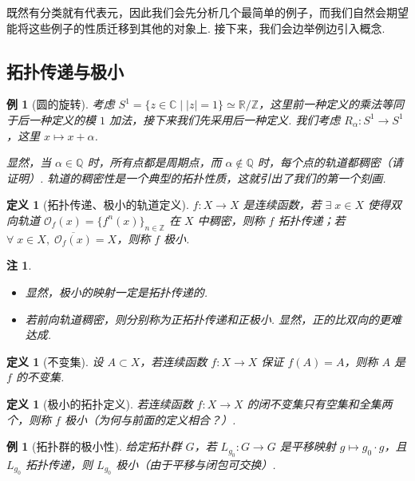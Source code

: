 \documentclass[11pt, a4paper, oneside]{ctexart}
\newtheorem{definition}[theorem]{定义}
\newtheorem{example}[theorem]{例}
\newtheorem{remark}[theorem]{注}
\newcommand{\C}{\mathbb{C}}
\newcommand{\Q}{\mathbb{Q}}
\newcommand{\R}{\mathbb{R}}
\newcommand{\Z}{\mathbb{Z}}
\newcommand{\cO}{\mathcal{O}}
\newcommand{\abs}[1]{\left|{#1}\right|}
\begin{document}
    既然有分类就有代表元，因此我们会先分析几个最简单的例子，而我们自然会期望能将这些例子的性质迁移到其他的对象上. 接下来，我们会边举例边引入概念.

    \subsection{拓扑传递与极小}
    \begin{example}[圆的旋转]
        考虑 $S^1=\{z\in \C\mid \abs{z}=1\}\simeq \R/\Z$，这里前一种定义的乘法等同于后一种定义的模 $1$ 加法，接下来我们先采用后一种定义. 我们考虑 $R_{\alpha}:S^1\to S^1$，这里 $x\mapsto x+\alpha$.

        显然，当 $\alpha\in\Q$ 时，所有点都是周期点，而 $\alpha\notin \Q$ 时，每个点的轨道都稠密（请证明）. 轨道的稠密性是一个典型的拓扑性质，这就引出了我们的第一个刻画.
    \end{example}

    \begin{definition}[拓扑传递、极小的轨道定义]
        $f:X\to X$ 是连续函数，若 $\exists\; x\in X$ 使得双向轨道 $\cO_f(x)={\{f^n(x)\}}_{n\in\Z}$ 在 $X$ 中稠密，则称 $f$ 拓扑传递；若 $\forall\; x\in X,\; \overline{\cO_f(x)}=X$，则称 $f$ 极小.
    \end{definition}
    \begin{remark}
        \begin{itemize}
            \item 显然，极小的映射一定是拓扑传递的.
            \item 若前向轨道稠密，则分别称为正拓扑传递和正极小. 显然，正的比双向的更难达成.
        \end{itemize}
    \end{remark}
    \begin{definition}[不变集]
        设 $A\subset X$，若连续函数 $f:X\to X$ 保证 $f(A)=A$，则称 $A$ 是 $f$ 的不变集.
    \end{definition}
    \begin{definition}[极小的拓扑定义]
        若连续函数 $f:X\to X$ 的闭不变集只有空集和全集两个，则称 $f$ 极小（为何与前面的定义相合？）.
    \end{definition}

    \begin{example}[拓扑群的极小性]\label{例3.6}
        给定拓扑群 $G$，若 $L_{g_0}:G\to G$ 是平移映射 $g\mapsto g_0\cdot g$，且 $L_{g_0}$ 拓扑传递，则 $L_{g_0}$ 极小（由于平移与闭包可交换）.
    \end{example}
\end{document}
